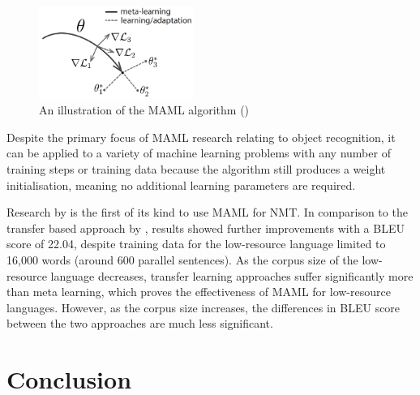 \begin{figure}[ht!]
\centering
\includegraphics[width=0.45\textwidth]{media/literature/nmt_approaches/maml.png}
\caption[Diagram of a \gls{MAML} algorithm]{An illustration of the \Gls{MAML} algorithm (\cite{finn_model-agnostic_2017})}
\label{fig:MAML}
\end{figure}

Despite the primary focus of \acrshort{MAML} research relating to object recognition, it can be applied to a variety of machine learning problems with any number of training steps or training data because the algorithm still produces a weight initialisation, meaning no additional learning parameters are required.



%
%

Research by \cite{gu_meta-learning_2018} is the first of its kind to use \acrshort{MAML} for \acrshort{NMT}. In comparison to the transfer based approach by \cite{zoph_transfer_2016}, results showed further improvements with a BLEU score of 22.04, despite training data for the low-resource language limited to 16,000 words (around 600 parallel sentences). As the corpus size of the low-resource language decreases, transfer learning approaches suffer significantly more than meta learning, which proves the effectiveness of \acrshort{MAML} for low-resource languages. However, as the corpus size increases, the differences in BLEU score between the two approaches are much less significant.

\section{Conclusion}
